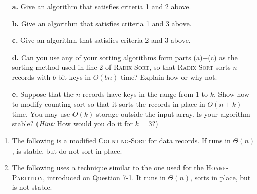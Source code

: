 \begin{enumerate}
{\begin{enumerate}
  \item[\textbf{a.}] Give an algorithm that satisfies criteria 1 and 2 above.
  \item[\textbf{b.}] Give an algorithm that satisfies criteria 1 and 3 above.
  \item[\textbf{c.}] Give an algorithm that satisfies criteria 2 and 3 above.
  \item[\textbf{d.}] Can you use any of your sorting algorithms form parts
    (a)${-}$(c) as the sorting method used in line 2 of \textsc{Radix-Sort}, so
    that \textsc{Radix-Sort} sorts $n$ records with $b$-bit keys in $O(bn)$
    time? Explain how or why not.
  \item[\textbf{e.}] Suppose that the $n$ records have keys in the range from
    1 to $k$. Show how to modify counting sort so that it sorts the records in
    place in $O(n + k)$ time. You may use $O(k)$ storage outside the input
    array. Is your algorithm stable? (\emph{Hint:} How would you do it for $k
    = 3$?)
\end{enumerate}
}

\begin{framed}
\begin{enumerate}
\item{The following is a modified \textsc{Counting-Sort} for data records. If
runs in $\Theta(n)$, is stable, but do not sort in place.

\begin{algorithm}[H]
\SetAlgoNoEnd\DontPrintSemicolon
\BlankLine
{}
\nonl{}
\end{algorithm}
}

\item{The following uses a technique similar to the one used for the
\textsc{Hoare-Partition}, introduced on Question 7-1. It runs in $\Theta(n)$,
sorts in place, but is not stable.

}
\end{enumerate}
\end{framed}
\end{enumerate}

